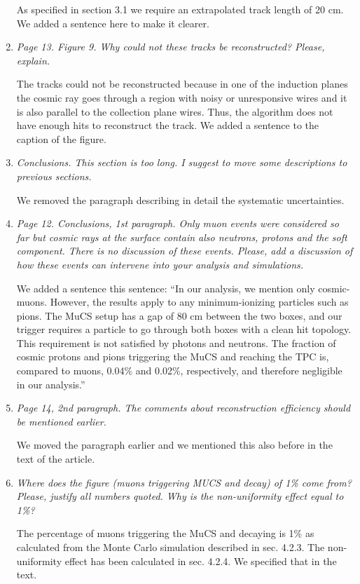 \documentclass[review,number,sort&compress]{article}
\begin{document}
\begin{enumerate}
As specified in section 3.1 we require an extrapolated track length of 20 cm. We added a sentence here to make it clearer.

\item \emph{Page 13. Figure 9.
Why could not these tracks be reconstructed? Please, explain.}

The tracks could not be reconstructed because in one of the induction planes the cosmic ray goes through a region with noisy or unresponsive wires and it is also parallel to the collection plane wires. Thus, the algorithm does not have enough hits to reconstruct the track. We added a sentence to the caption of the figure.

\item \emph{Conclusions.
This section is too long. I suggest to move some descriptions to previous sections.}

We removed the paragraph describing in detail the systematic uncertainties.

\item \emph{Page 12. Conclusions, 1st paragraph.
Only muon events were considered so far but cosmic rays at the surface contain also neutrons, protons and the soft component. There is no discussion of these events. Please, add a discussion of how these events can intervene into your analysis and simulations.}

We added a sentence this sentence: ``In our analysis, we mention only cosmic-muons. However, the results apply to any minimum-ionizing particles such as pions. The MuCS setup has a gap of 80 cm between the two boxes, and our trigger requires a particle to go through both boxes with a clean hit topology. This requirement is not satisfied by photons and neutrons. The fraction of cosmic protons and pions triggering the MuCS and reaching the TPC is, compared to muons, 0.04\% and 0.02\%, respectively, and therefore negligible in our analysis.''

\item \emph{Page 14, 2nd paragraph.
The comments about reconstruction efficiency should be mentioned earlier.}

We moved the paragraph earlier and we mentioned this also before in the text of the article.

\item \emph{Where does the figure (muons triggering MUCS and decay) of 1\% come from? Please, justify all numbers quoted.
Why is the non-uniformity effect equal to 1\%?}

The percentage of muons triggering the MuCS and decaying is 1\% as calculated from the Monte Carlo simulation described in sec. 4.2.3. The non-uniformity effect has been calculated in sec. 4.2.4. We specified that in the text.

\end{enumerate}
\end{document}

